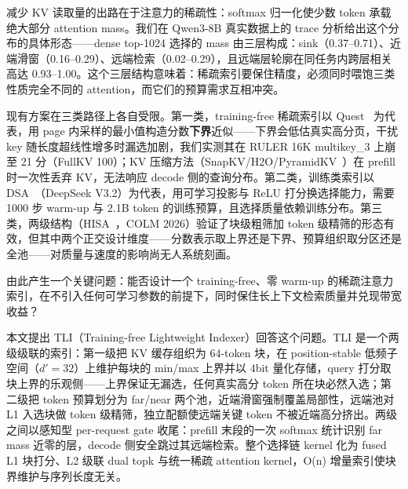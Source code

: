 \documentclass[11pt]{article}
\begin{document}
减少 KV 读取量的出路在于注意力的稀疏性：softmax 归一化使少数 token 承载绝大部分 attention mass。我们在 Qwen3-8B 真实数据上的 trace 分析给出这个分布的具体形态——dense top-1024 选择的 mass 由三层构成：sink（0.37--0.71）、近端滑窗（0.16--0.29）、远端检索（0.02--0.29），且远端层轮廓在同任务内跨层相关高达 0.93--1.00。这个三层结构意味着：稀疏索引要保住精度，必须同时喂饱三类性质完全不同的 attention，而它们的预算需求互相冲突。

现有方案在三类路径上各自受限。第一类，training-free 稀疏索引以 Quest~\cite{quest} 为代表，用 page 内采样的最小值构造分数\textbf{下界}近似——下界会低估真实高分页，干扰 key 随长度超线性增多时漏选加剧，我们实测其在 RULER 16K multikey\_3 上崩至 21 分（FullKV 100）；KV 压缩方法（SnapKV/H2O/PyramidKV~\cite{snapkv,h2o,pyramidkv}）在 prefill 时一次性丢弃 KV，无法响应 decode 侧的查询分布。第二类，训练类索引以 DSA~\cite{dsa}（DeepSeek V3.2）为代表，用可学习投影与 ReLU 打分换选择能力，需要 1000 步 warm-up 与 2.1B token 的训练预算，且选择质量依赖训练分布。第三类，两级结构（HISA~\cite{hisa}，COLM 2026）验证了块级粗筛加 token 级精筛的形态有效，但其中两个正交设计维度——分数表示取上界还是下界、预算组织取分区还是全池——对质量与速度的影响尚无人系统刻画。

由此产生一个关键问题：能否设计一个 training-free、零 warm-up 的稀疏注意力索引，在不引入任何可学习参数的前提下，同时保住长上下文检索质量并兑现带宽收益？

本文提出 TLI（Training-free Lightweight Indexer）回答这个问题。TLI 是一个两级级联的索引：第一级把 KV 缓存组织为 64-token 块，在 position-stable 低频子空间（$d'{=}32$）上维护每块的 min/max 上界并以 4bit 量化存储，query 打分取块上界的乐观侧——上界保证无漏选，任何真实高分 token 所在块必然入选；第二级把 token 预算划分为 far/near 两个池，近端滑窗强制覆盖局部性，远端池对 L1 入选块做 token 级精筛，独立配额使远端关键 token 不被近端高分挤出。两级之间以感知型 per-request gate 收尾：prefill 末段的一次 softmax 统计识别 far mass 近零的层，decode 侧安全跳过其远端检索。整个选择链 kernel 化为 fused L1 块打分、L2 级联 dual topk 与统一稀疏 attention kernel，O(n) 增量索引使块界维护与序列长度无关。
\end{document}
